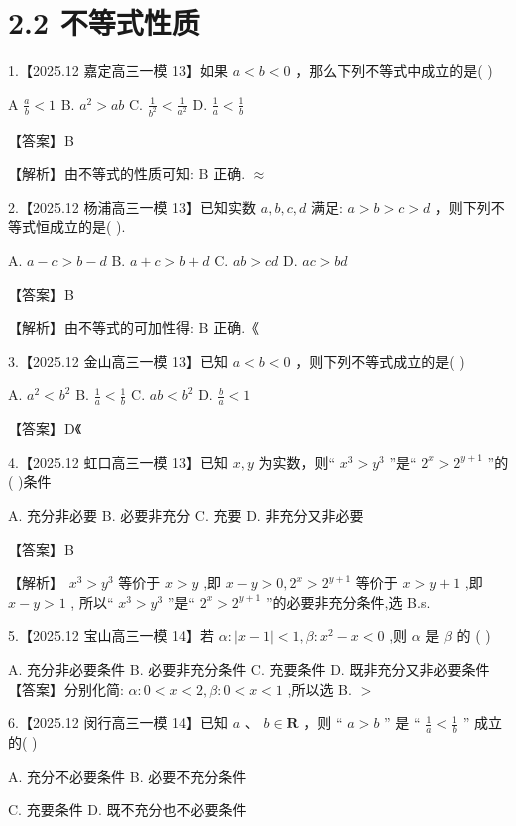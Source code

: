 \documentclass[10pt]{article}
\begin{document}
\section*{2.2 不等式性质}

1.【2025.12 嘉定高三一模 13】如果 \(a < b < 0\) ，那么下列不等式中成立的是( )

A \(\frac{a}{b} < 1\) B. \({a}^{2} > {ab}\) C. \(\frac{1}{{b}^{2}} < \frac{1}{{a}^{2}}\) D. \(\frac{1}{a} < \frac{1}{b}\)

【答案】B

【解析】由不等式的性质可知: \(\mathrm{B}\) 正确. \(\approx\)

2.【2025.12 杨浦高三一模 13】已知实数 \(a,b,c,d\) 满足: \(a > b > c > d\) ，则下列不等式恒成立的是( ).

A. \(a - c > b - d\) B. \(a + c > b + d\) C. \({ab} > {cd}\) D. \({ac} > {bd}\)

【答案】B

【解析】由不等式的可加性得: B 正确.《

3.【2025.12 金山高三一模 13】已知 \(a < b < 0\) ，则下列不等式成立的是( )

A. \({a}^{2} < {b}^{2}\) B. \(\frac{1}{a} < \frac{1}{b}\) C. \({ab} < {b}^{2}\) D. \(\frac{b}{a} < 1\)

【答案】D《

4.【2025.12 虹口高三一模 13】已知 \(x,y\) 为实数，则“ \({x}^{3} > {y}^{3}\) ”是“ \({2}^{x} > {2}^{y + 1}\) ”的( )条件

A. 充分非必要 B. 必要非充分 C. 充要 D. 非充分又非必要

【答案】B

【解析】 \({x}^{3} > {y}^{3}\) 等价于 \(x > y\) ,即 \(x - y > 0,{2}^{x} > {2}^{y + 1}\) 等价于 \(x > y + 1\) ,即 \(x - y > 1\) , 所以“ \({x}^{3} > {y}^{3}\) ”是“ \({2}^{x} > {2}^{y + 1}\) ”的必要非充分条件,选 B.s.

5.【2025.12 宝山高三一模 14】若 \(\alpha  : \left| {x - 1}\right|  < 1,\beta  : {x}^{2} - x < 0\) ,则 \(\alpha\) 是 \(\beta\) 的 ( )

A. 充分非必要条件 B. 必要非充分条件 C. 充要条件 D. 既非充分又非必要条件 【答案】分别化简: \(\alpha  : 0 < x < 2,\beta  : 0 < x < 1\) ,所以选 B. \(>\)

6.【2025.12 闵行高三一模 14】已知 \(a\text{ 、 }b \in  \mathbf{R}\) ，则 “ \(a > b\) ” 是 “ \(\frac{1}{a} < \frac{1}{b}\) ” 成立的( )

A. 充分不必要条件 B. 必要不充分条件

C. 充要条件 D. 既不充分也不必要条件
\end{document}
